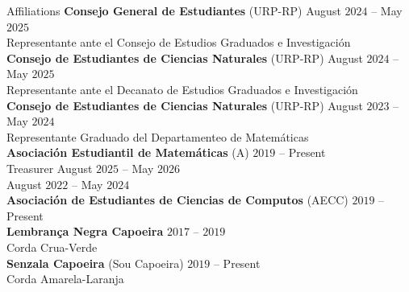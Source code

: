 \documentclass{resume}
\begin{document}
\begin{rSection}{Affiliations}
  \textbf{Consejo General de Estudiantes} (URP-RP)
            \hfill August $2024$ -- May $2025$  \\
  Representante ante el Consejo de Estudios Graduados e
  Investigaci\'on \\

  \textbf{Consejo de Estudiantes de Ciencias Naturales} (URP-RP)
            \hfill August $2024$ -- May $2025$  \\
  Representante ante el Decanato de Estudios Graduados e
  Investigaci\'on \\

  \textbf{Consejo de Estudiantes de Ciencias Naturales} (URP-RP)
            \hfill August $2023$ -- May $2024$  \\
  Representante Graduado del Departamenteo de Matem\'aticas \\

  \textbf{Asociaci\'on Estudiantil de Matem\'aticas}
  (A\alpha\tau)
            \hfill $2019$ -- Present \medskip \\
    Treasurer \hfill August $2025$ -- May $2026$ \\
    \hspace*{10cm} \hfill August $2022$ -- May $2024$ \\

  \textbf{Asociaci\'on de Estudiantes de Ciencias de Computos} (AECC)
            \hfill $2019$ --  Present \\

  \textbf{Lembran\c{c}a Negra Capoeira} \hfill $2017$ -- $2019$ \\
  Corda Crua-Verde  \\

  \textbf{Senzala Capoeira} (Sou Capoeira) \hfill $2019$ -- Present \\
  Corda Amarela-Laranja  \\

\end{rSection}
\end{document}
